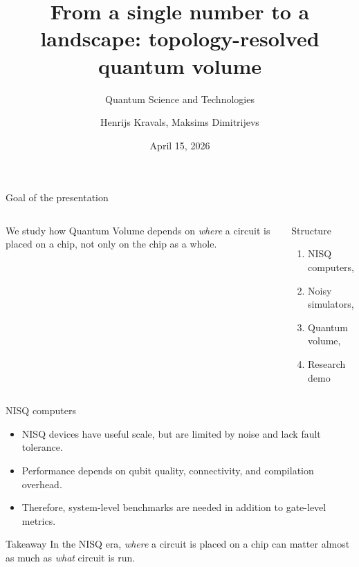 \documentclass{beamer}
\title[ Topology-resolved quantum volume ]{ From a single number to a landscape: topology-resolved quantum volume }
\subtitle[Quantum Science and Technologies]{Quantum Science and Technologies}
\author[H.~Kravals, M.~Dimitrijevs]{Henrijs Kravals, Maksims Dimitrijevs}
\institute[LU]{Latvijas Universitāte}
\date[Apr 2026]{April 15, 2026}
\begin{document}
\maketitle


\begin{frame}{Goal of the presentation}
    \begin{columns}[T,totalwidth=\textwidth]
        We study how Quantum Volume depends on \emph{where} a circuit is placed on a chip, not only on the chip as a whole.

        \begin{block}{Structure}
            \begin{enumerate}
                \item NISQ computers,
                \item Noisy simulators,
                \item Quantum volume,
                \item Research demo
            \end{enumerate}
        \end{block}
    \end{columns}
\end{frame}


\begin{frame}{NISQ computers}
    \begin{itemize}
        \item NISQ devices have useful scale, but are limited by noise and lack fault tolerance.
        \item Performance depends on qubit quality, connectivity, and compilation overhead.
        \item Therefore, system-level benchmarks are needed in addition to gate-level metrics.
    \end{itemize}

    \begin{block}{Takeaway}
        In the NISQ era, \emph{where} a circuit is placed on a chip can matter almost as much as \emph{what} circuit is run.
    \end{block}
\end{frame}
\end{document}
